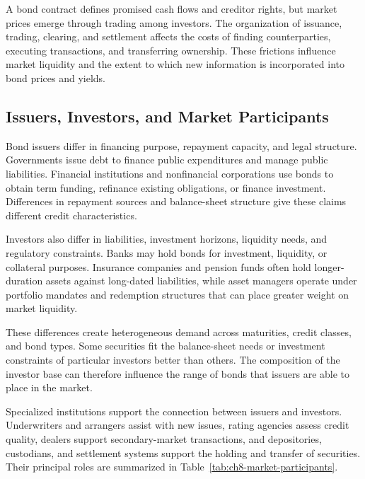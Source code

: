 A bond contract defines promised cash flows and creditor rights, but market prices emerge through trading among investors. The organization of issuance, trading, clearing, and settlement affects the costs of finding counterparties, executing transactions, and transferring ownership. These frictions influence market liquidity and the extent to which new information is incorporated into bond prices and yields.

\subsection{Issuers, Investors, and Market Participants}

Bond issuers differ in financing purpose, repayment capacity, and legal structure. Governments issue debt to finance public expenditures and manage public liabilities. Financial institutions and nonfinancial corporations use bonds to obtain term funding, refinance existing obligations, or finance investment. Differences in repayment sources and balance-sheet structure give these claims different credit characteristics.

Investors also differ in liabilities, investment horizons, liquidity needs, and regulatory constraints. Banks may hold bonds for investment, liquidity, or collateral purposes. Insurance companies and pension funds often hold longer-duration assets against long-dated liabilities, while asset managers operate under portfolio mandates and redemption structures that can place greater weight on market liquidity.

These differences create heterogeneous demand across maturities, credit classes, and bond types. Some securities fit the balance-sheet needs or investment constraints of particular investors better than others. The composition of the investor base can therefore influence the range of bonds that issuers are able to place in the market.

Specialized institutions support the connection between issuers and investors. Underwriters and arrangers assist with new issues, rating agencies assess credit quality, dealers support secondary-market transactions, and depositories, custodians, and settlement systems support the holding and transfer of securities. Their principal roles are summarized in Table~\ref{tab:ch8-market-participants}.

